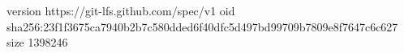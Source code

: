 version https://git-lfs.github.com/spec/v1
oid sha256:23f1f3675ca7940b2b7c580dded6f40dfc5d497bd99709b7809e8f7647c6c627
size 1398246
